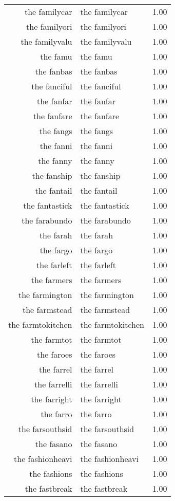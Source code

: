 \begin{table}[ht]
\begin{tabular}{rlr}
  the familycar & the familycar & 1.00 \\ 
  the familyori & the familyori & 1.00 \\ 
  the familyvalu & the familyvalu & 1.00 \\ 
  the famu & the famu & 1.00 \\ 
  the fanbas & the fanbas & 1.00 \\ 
  the fanciful & the fanciful & 1.00 \\ 
  the fanfar & the fanfar & 1.00 \\ 
  the fanfare & the fanfare & 1.00 \\ 
  the fangs & the fangs & 1.00 \\ 
  the fanni & the fanni & 1.00 \\ 
  the fanny & the fanny & 1.00 \\ 
  the fanship & the fanship & 1.00 \\ 
  the fantail & the fantail & 1.00 \\ 
  the fantastick & the fantastick & 1.00 \\ 
  the farabundo & the farabundo & 1.00 \\ 
  the farah & the farah & 1.00 \\ 
  the fargo & the fargo & 1.00 \\ 
  the farleft & the farleft & 1.00 \\ 
  the farmers & the farmers & 1.00 \\ 
  the farmington & the farmington & 1.00 \\ 
  the farmstead & the farmstead & 1.00 \\ 
  the farmtokitchen & the farmtokitchen & 1.00 \\ 
  the farmtot & the farmtot & 1.00 \\ 
  the faroes & the faroes & 1.00 \\ 
  the farrel & the farrel & 1.00 \\ 
  the farrelli & the farrelli & 1.00 \\ 
  the farright & the farright & 1.00 \\ 
  the farro & the farro & 1.00 \\ 
  the farsouthsid & the farsouthsid & 1.00 \\ 
  the fasano & the fasano & 1.00 \\ 
  the fashionheavi & the fashionheavi & 1.00 \\ 
  the fashions & the fashions & 1.00 \\ 
  the fastbreak & the fastbreak & 1.00 \\ 

\end{tabular}
\end{table}
